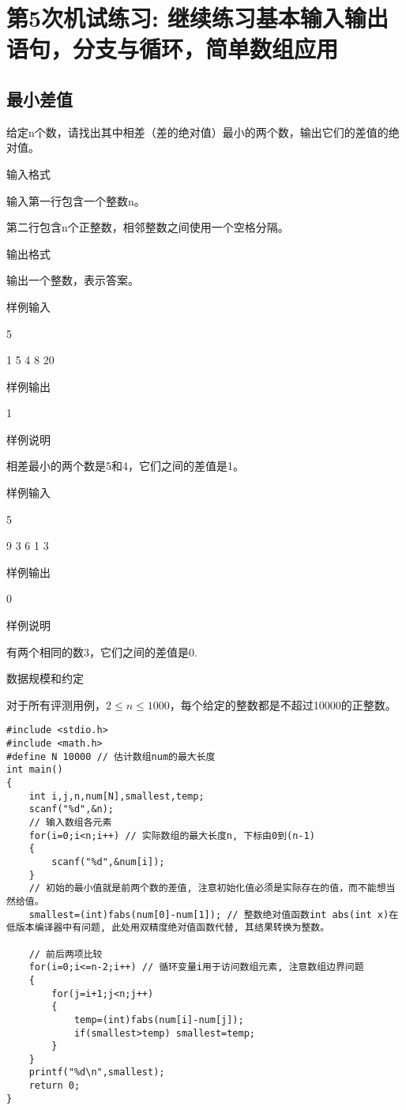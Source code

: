 %
%
%
\chapter{第5次机试练习: 继续练习基本输入输出语句，分支与循环，简单数组应用}

\section{最小差值}
给定n个数，请找出其中相差（差的绝对值）最小的两个数，输出它们的差值的绝对值。

输入格式

输入第一行包含一个整数n。

第二行包含n个正整数，相邻整数之间使用一个空格分隔。

输出格式

输出一个整数，表示答案。

样例输入

5

1 5 4 8 20

样例输出

1

样例说明

相差最小的两个数是5和4，它们之间的差值是1。

样例输入

5

9 3 6 1 3

样例输出

0

样例说明

有两个相同的数3，它们之间的差值是0.

数据规模和约定

对于所有评测用例，$2\le n\le1000$，每个给定的整数都是不超过10000的正整数。

\begin{lstlisting}
#include <stdio.h>
#include <math.h>
#define N 10000 // 估计数组num的最大长度 
int main()
{
	int i,j,n,num[N],smallest,temp; 
	scanf("%d",&n);
	// 输入数组各元素
	for(i=0;i<n;i++) // 实际数组的最大长度n, 下标由0到(n-1)
	{
		scanf("%d",&num[i]);
	}
	// 初始的最小值就是前两个数的差值, 注意初始化值必须是实际存在的值，而不能想当然给值。
	smallest=(int)fabs(num[0]-num[1]); // 整数绝对值函数int abs(int x)在低版本编译器中有问题, 此处用双精度绝对值函数代替, 其结果转换为整数。  
	
	// 前后两项比较
	for(i=0;i<=n-2;i++) // 循环变量i用于访问数组元素, 注意数组边界问题
	{
		for(j=i+1;j<n;j++)
		{
			temp=(int)fabs(num[i]-num[j]);
			if(smallest>temp) smallest=temp;
		}
	}
	printf("%d\n",smallest);
	return 0;
} 
\end{lstlisting}

